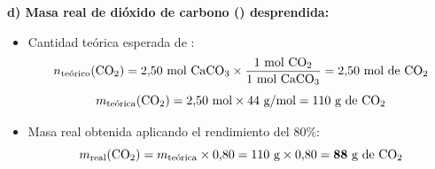 ﻿\documentclass[11pt,a4paper]{article}
\begin{document}
\vspace{0.1cm}
\noindent\textbf{d) Masa real de dióxido de carbono () desprendida:}
\begin{itemize}[leftmargin=1.5em, itemsep=2pt]
    \item Cantidad teórica esperada de :
    \[
    n_{\text{teórico}}(\ce{CO2}) = 2{,}50\text{ mol \ce{CaCO3}} \times \frac{1\text{ mol \ce{CO2}}}{1\text{ mol \ce{CaCO3}}} = 2{,}50\text{ mol de \ce{CO2}}
    \]
    \[
    m_{\text{teórica}}(\ce{CO2}) = 2{,}50\text{ mol} \times 44\text{ g/mol} = 110\text{ g de \ce{CO2}}
    \]
    \item Masa real obtenida aplicando el rendimiento del $80\%$:
    \[
    m_{\text{real}}(\ce{CO2}) = m_{\text{teórica}} \times 0{,}80 = 110\text{ g} \times 0{,}80 = \mathbf{88\text{ g de \ce{CO2}}}
    \]
\end{itemize}
\end{document}
